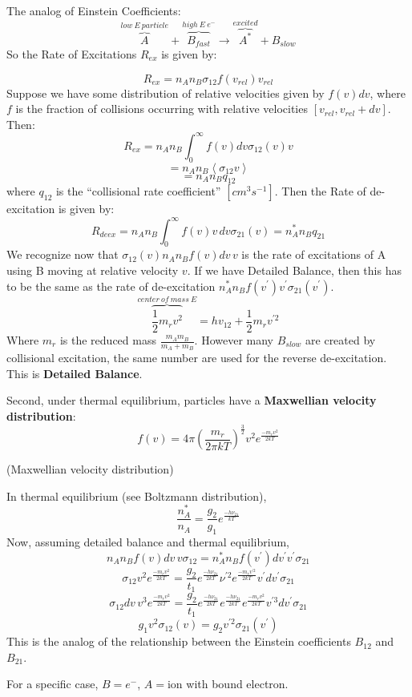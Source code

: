 \documentclass{article}
\def\sigot{\sigma_{12}}
\def\sigto{\sigma_{21}}
\def\mean#1{\left\langle {#1}\right\rangle}
\def\sigot{\sigma_{12}}
\def\sigto{\sigma_{21}}
\begin{document}
The analog of Einstein Coefficients:
$$\overbrace{A}^{low\ E\ particle} + \overbrace{B_{fast}}^{high\ E\ e^-}
\to \overbrace{A^*}^{excited} + B_{slow}$$
So the Rate of Excitations $R_{ex}$ is given by:

\def\rex{R_{ex}}
\def\vrel{v_{rel}}
$$\rex = n_An_B\sigma_{12}f(\vrel)\vrel$$
Suppose we have some distribution of relative velocities given by $f(v)dv$,
where $f$ is the fraction of collisions occurring with relative velocities
$[\vrel, \vrel +dv]$.  Then:
$$\rex = n_An_B\int_0^{\infty}f(v)dv\sigot(v)v$$
$$=n_An_B \mean{\sigot v}$$
\def\qot{q_{12}}
\def\qto{q_{21}}
$$=n_An_B\qot$$
where $\qot$ is the ``collisional rate coefficient'' $[cm^3s^{-1}]$.  Then the
Rate of de-excitation is given by:
$$R_{deex} = n_An_B\int_0^\infty{f(v)v\,dv\sigma_{21}(v) = n_A^*n_B\qto}$$
We recognize now that $\sigot(v)n_An_Bf(v)dv\,v$ is the rate of excitations of 
A using B moving at relative velocity $v$.  If we have Detailed Balance,
then this has to be the same as the rate of de-excitation
$n_A^*n_Bf(v^\prime)v^\prime\sigto(v^\prime)$.
$$\overbrace{\frac12 m_rv^2}^{center\ of\ mass\ E} = hv_{12} + \frac12 m_rv^{\prime2}$$
Where $m_r$ is the reduced mass $\frac{m_Am_B}{m_A+m_B}$. However many $B_{slow}$
are created by collisional excitation, the same number are used for the
reverse de-excitation.  This is {\bf Detailed Balance}.\par
Second, under thermal equilibrium, particles have a {\bf Maxwellian velocity distribution}:
$$\boxed{f(v)=4\pi\left(\frac{m_r}{ 2\pi kT}\right)^\frac{3}{ 2}v^2
e^\frac{-m_rv^2}{2kT}}$$
\centerline{(Maxwellian velocity distribution)}
In thermal equilibrium (see Boltzmann distribution),
$$\frac{n_A^*}{ n_A} = \frac{g_2}{ g_1}e^\frac{-h\nu_{21}}{ kT}$$
Now, assuming detailed balance and thermal equilibrium,
$$n_An_Bf(v)dv\,v\sigot=n_A^*n_Bf(v^\prime)dv^\prime v^\prime \sigto$$
\def\emvkt{e^\frac{-m_rv^2}{2kT}}
\def\emvpkt{e^\frac{-m_rv^{\prime2}}{2kT}}
\def\ehvkt{e^\frac{-h\nu_{21}}{2kT}}
$$\sigot v^2\emvkt = \frac{g_2}{t_1}\ehvkt \nu^{\prime2}\emvpkt v^\prime 
dv^\prime\sigto$$
$$\sigot dv\,v^3 \emvkt = \frac{g_2}{t_1}\ehvkt \ehvkt \emvkt v^{\prime3}
dv^\prime \sigto$$
$$\boxed{g_1v^2\sigot(v) = g_2v^{\prime2}\sigto(v^\prime)}$$
This is the analog of the relationship between the Einstein coefficients $B_{12}$ and $B_{21}$.

For a specific case, $B=e^-$, $A=$ion with bound electron.
\end{document}
